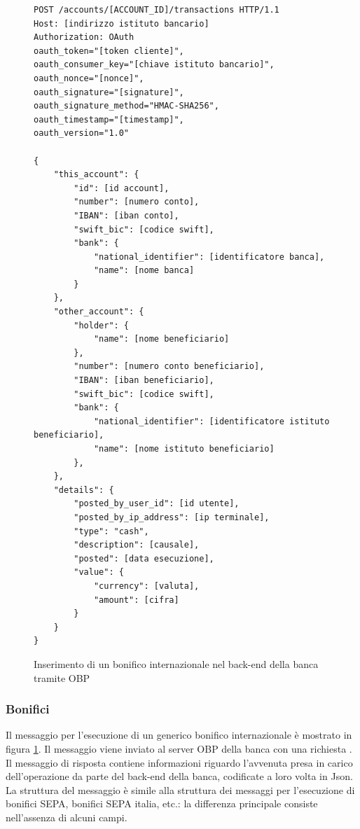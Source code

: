 \begin{figure}[h]
\begin{lstlisting}[basicstyle=\ttfamily]
POST /accounts/[ACCOUNT_ID]/transactions HTTP/1.1
Host: [indirizzo istituto bancario]
Authorization: OAuth
oauth_token="[token cliente]",
oauth_consumer_key="[chiave istituto bancario]",
oauth_nonce="[nonce]",
oauth_signature="[signature]",
oauth_signature_method="HMAC-SHA256",
oauth_timestamp="[timestamp]",
oauth_version="1.0"

{
    "this_account": {
        "id": [id account],
        "number": [numero conto],
        "IBAN": [iban conto],
        "swift_bic": [codice swift],
        "bank": {
            "national_identifier": [identificatore banca],
            "name": [nome banca]
        }
    },
    "other_account": {
        "holder": {
            "name": [nome beneficiario]
        },
        "number": [numero conto beneficiario],
        "IBAN": [iban beneficiario],
        "swift_bic": [codice swift],
        "bank": {
            "national_identifier": [identificatore istituto beneficiario],
            "name": [nome istituto beneficiario]
        },
    },
    "details": {
        "posted_by_user_id": [id utente],
        "posted_by_ip_address": [ip terminale],
        "type": "cash",
        "description": [causale],
        "posted": [data esecuzione],
        "value": {
            "currency": [valuta],
            "amount": [cifra]
        }
    }
}
\end{lstlisting}
	\caption{\label{fig:operazioni:bonifico-internazionale:json}Inserimento di un bonifico internazionale nel back-end della banca tramite OBP}
\end{figure}

\subsubsection{Bonifici}

Il messaggio per l'esecuzione di un generico bonifico internazionale \`e mostrato in figura \ref{fig:operazioni:bonifico-internazionale:json}.
Il messaggio viene inviato al server OBP della banca con una richiesta .
Il messaggio di risposta contiene informazioni riguardo l'avvenuta presa in carico dell'operazione da parte del back-end della banca, codificate a loro volta in Json.
La struttura del messaggio \`e simile alla struttura dei messaggi per l'esecuzione di bonifici SEPA, bonifici SEPA italia, etc.: la differenza principale consiste nell'assenza di alcuni campi.

